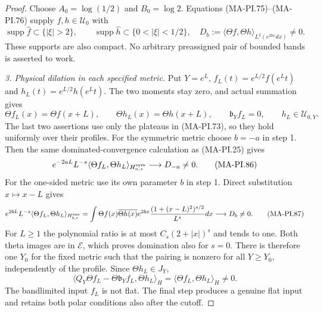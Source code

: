\begin{proof}
Choose $A_0=\log(1/2)$ and $B_0=\log2$. Equations
(MA-PI.75)--(MA-PI.76) supply $f,h\in\mathcal U_0$ with
\[
 \operatorname{supp}\widehat f\subset\{|\xi|>2\},\qquad
 \operatorname{supp}\widehat h\subset\{0<|\xi|<1/2\},
 \quad D_b:=\langle\Theta f,\Theta h\rangle_{L^2(e^{2bx}dx)}
                              \ne0.
 \tag{MA-PI.84}
\]
These supports are also compact. No arbitrary preassigned
pair of bounded bands is asserted to work.

\emph{3. Physical dilation in each specified metric.}
Put $Y=e^L$, $f_L(t)=e^{L/2}f(e^Lt)$ and
$h_L(t)=e^{L/2}h(e^Lt)$. The two moments stay zero,
and actual summation gives
\[
 \Theta f_L(x)=\Theta f(x+L),\qquad
 \Theta h_L(x)=\Theta h(x+L),\qquad
 \mathfrak b_Y f_L=0,\qquad h_L\in\mathcal U_{0,Y}.
 \tag{MA-PI.85}
\]
The last two assertions use only the plateaus in
(MA-PI.73), so they hold uniformly over their profiles.
For the symmetric metric choose $b=-a$ in step 1.
Then the same dominated-convergence calculation as
(MA-PI.25) gives
\[
 e^{-2aL}L^{-s}
       \langle\Theta f_L,\Theta h_L\rangle_{H^{\rm sym}_{a,s}}
                        \longrightarrow D_{-a}\ne0.
 \tag{MA-PI.86}
\]
For the one-sided metric use its own parameter $b$ in
step 1. Direct substitution $x\mapsto x-L$ gives
\[
 e^{2bL}L^{-s}
       \langle\Theta f_L,\Theta h_L\rangle_{H^{\rm one}_{b,s}}
 =\int\Theta f(x)\overline{\Theta h(x)}e^{2bx}
       \frac{(1+(x-L)^2)^{s/2}}{L^s}dx
                         \longrightarrow D_b\ne0.
 \tag{MA-PI.87}
\]
For $L\ge1$ the polynomial ratio is at most
$C_s(2+|x|)^s$ and tends to one. Both theta images are
in $\mathcal E$, which proves domination also for $s=0$.
There is therefore one $Y_0$ for the fixed metric such
that the pairing is nonzero for all $Y\ge Y_0$,
independently of the profile. Since $\Theta h_L\in J_Y$,
\[
 \langle Q_Y\Theta f_L-\Theta\mathfrak b_Y f_L,
                      \Theta h_L\rangle_H
                 =\langle\Theta f_L,\Theta h_L\rangle_H\ne0.
 \tag{MA-PI.88}
\]
The bandlimited input $f_L$ is not flat. The final step
produces a genuine flat input and retains both polar
conditions also after the cutoff.


\end{proof}

